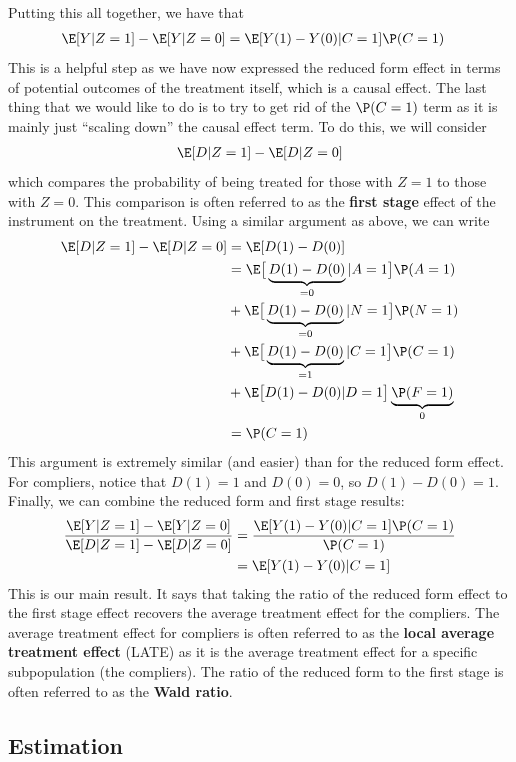\documentclass[
  letterpaper,
  DIV=11,
  numbers=noendperiod]{scrreprt}
\begin{document}
Putting this all together, we have that \begin{align*}
  \E[Y | Z=1] - \E[Y | Z=0] &= \E[Y(1) - Y(0) | C=1] \P(C=1)
\end{align*} This is a helpful step as we have now expressed the reduced
form effect in terms of potential outcomes of the treatment itself,
which is a causal effect. The last thing that we would like to do is to
try to get rid of the \(\P(C=1)\) term as it is mainly just ``scaling
down'' the causal effect term. To do this, we will consider
\begin{align*}
  \E[D | Z=1] - \E[D | Z=0]
\end{align*} which compares the probability of being treated for those
with \(Z=1\) to those with \(Z=0\). This comparison is often referred to
as the \textbf{first stage} effect of the instrument on the treatment.
Using a similar argument as above, we can write \begin{align*}
  \E[D | Z=1] - \E[D | Z=0] &= \E[D(1) - D(0)] \\
  &= \E\big[\underbrace{D(1) - D(0)}_{=0} | A=1\big] \P(A=1) \\
  &+ \E\big[\underbrace{D(1) - D(0)}_{=0} | N=1\big] \P(N=1) \\
  &+ \E\big[\underbrace{D(1) - D(0)}_{=1} | C=1\big] \P(C=1) \\
  &+ \E\big[D(1) - D(0) | D=1\big] \underbrace{\P(F=1)}_{0} \\
  &= \P(C=1)
\end{align*} This argument is extremely similar (and easier) than for
the reduced form effect. For compliers, notice that \(D(1)=1\) and
\(D(0)=0\), so \(D(1) - D(0) = 1\). Finally, we can combine the reduced
form and first stage results: \begin{align*}
  \frac{\E[Y | Z=1] - \E[Y | Z=0]}{\E[D | Z=1] - \E[D | Z=0]} &= \frac{\E[Y(1) - Y(0) | C=1] \P(C=1)}{\P(C=1)} \\
  &= \E[Y(1) - Y(0) | C=1]
\end{align*} This is our main result. It says that taking the ratio of
the reduced form effect to the first stage effect recovers the average
treatment effect for the compliers. The average treatment effect for
compliers is often referred to as the \textbf{local average treatment
effect} (LATE) as it is the average treatment effect for a specific
subpopulation (the compliers). The ratio of the reduced form to the
first stage is often referred to as the \textbf{Wald ratio}.

\subsection{Estimation}\label{estimation}
\end{document}

